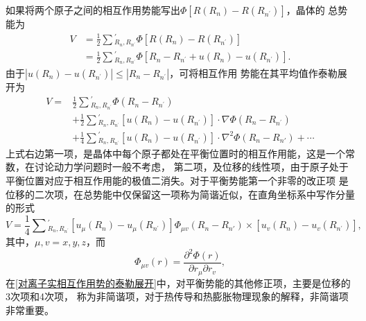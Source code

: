             如果将两个原子之间的相互作用势能写出$\Phi[R(R_n)-R(R_{n^{\prime}})]$，晶体的
            总势能为
            \begin{equation}
                \begin{aligned}
                    V&=\frac{1}{2}\sum{}^{\prime}_{R_n,R_{n^\prime}}\Phi[R(R_n)-R(R_{n^{\prime}})]\\
                    &=\frac{1}{2}\sum{}^{\prime}_{R_n,R_{n^\prime}}\Phi[R_n-R_{n^{\prime}}+u(R_n)-u(R_{n^{\prime}})].
                \end{aligned}
            \end{equation}
            由于$\left\vert u(R_n)-u(R_{n^\prime})\right\vert\leq\left\vert R_n-R_{n^{\prime}}\right\vert$，可将相互作用
            势能在其平均值作泰勒展开为
            \begin{equation}
                \begin{aligned}
                    V=&\frac{1}{2}\sum{}^{\prime}_{R_n,R_{n^\prime}}\Phi(R_n-R_{n^\prime})\\
                    &+\frac{1}{2}\sum{}^{\prime}_{R_n,R_{n^\prime}}[u(R_n)-u(R_{n^\prime})]\cdot\nabla\Phi(R_n-R_{n^\prime})\\
                    &+\frac{1}{4}\sum{}^{\prime}_{R_n,R_{n^\prime}}[u(R_n)-u(R_{n^\prime})]\cdot\nabla^2\Phi(R_n-R_{n'})+\cdots
                \end{aligned}\label{对离子实相互作用势的泰勒展开}
            \end{equation}
            上式右边第一项，是晶体中每个原子都处在平衡位置时的相互作用能，这是一个常数，在讨论动力学问题时一般不考虑，
            第二项，及位移的线性项，由于原子处于平衡位置对应于相互作用能的极值二消失。对于平衡势能第一个非零的改正项
            是位移的二次项，在总势能中仅保留这一项称为简谐近似，在直角坐标系中写作分量的形式
            \begin{equation}
                V=\frac{1}{4}\sum{}^{\prime}_{R_n,R_{n^\prime}}[u_\mu(R_n)-u_\mu(R_{n^\prime})]\Phi_{\mu v}(R_n-R_{n'})\times[u_v(R_n)-u_v(R_{n^\prime})]\label{简谐近似的相互作用能},
            \end{equation}
            其中，$\mu,v=x,y,z$，而
            \begin{equation}
                \Phi_{\mu v}(r)=\frac{\partial^2\Phi(r)}{\partial r_\mu\partial r_v},
            \end{equation}
            在\autoref{对离子实相互作用势的泰勒展开}中，对平衡势能的其他修正项，主要是位移的3次项和4次项，
            称为非简谐项，对于热传导和热膨胀物理现象的解释，非简谐项非常重要。


